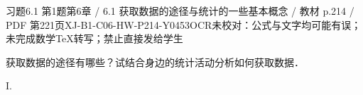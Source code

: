 \begin{bankitem}{习题6.1 第1题}{第6章 / 6.1 获取数据的途径与统计的一些基本概念 / 教材 p.214 / PDF 第221页}{XJ-B1-C06-HW-P214-Y0453}{OCR未校对：公式与文字均可能有误；未完成数学TeX转写；禁止直接发给学生}
\begin{ocrdraft}
\par
获取数据的途径有哪些？试结合身边的统计活动分析如何获取数据．
\par
I.
\end{ocrdraft}
\end{bankitem}
